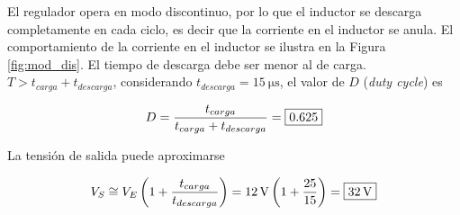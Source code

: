 \begin{itemize}

		El regulador opera en modo discontinuo, por lo que el inductor se descarga completamente en cada ciclo, es decir que la corriente en el inductor se anula. El comportamiento de la corriente en el inductor se ilustra en la Figura \ref{fig:mod_dis}. El tiempo de descarga debe ser menor al de carga. $T > t_{carga} + t_{descarga}$, considerando $t_{descarga} = \SI{15}{\micro\second}$, el valor de $D$ (\textit{duty cycle}) es 

		\begin{equation}
			\centering
			D = \frac{t_{carga}}{t_{carga} + t_{descarga}} =\boxed{\num{0,625}}
		\end{equation}
		
		La tensión de salida puede aproximarse

		\begin{equation}
			\centering
			V_S \cong V_E \left( 1 + \frac{t_{carga}}{t_{descarga}} \right) = \SI{12}{\volt} \left(1+ \frac{25}{15}\right) = \boxed{\SI{32}{\volt}}
		\end{equation}


\end{itemize}
